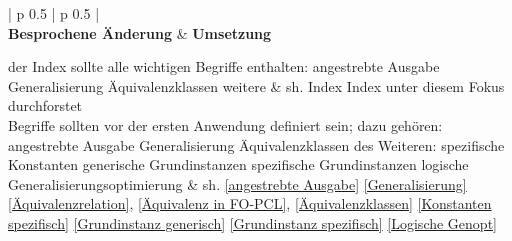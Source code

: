 \documentclass[a4paper, 11pt]{book}
\newlength{\currentLongTableWidth} %
\begin{document}
\setlength{\currentLongTableWidth}{\textwidth} %
\addtolength{\currentLongTableWidth}{-4\tabcolsep} %
\begin{footnotesize}
	\begin{longtable}{ | p {0.5\currentLongTableWidth} | p {0.5\currentLongTableWidth}  |}
		\hline
		\\\hline\hline
		\hline
		\textbf{Besprochene Änderung} 
		& \textbf{Umsetzung} 
	
		
		\endhead
		\hline
		\endfoot
		\endlastfoot
		\hline
		der Index sollte alle wichtigen Begriffe enthalten: \newline angestrebte Ausgabe \newline Generalisierung \newline Äquivalenzklassen \newline weitere
		& sh.  Index \newline \newline \newline \newline Index unter diesem Fokus durchforstet\\
		\hline
		Begriffe sollten vor der ersten Anwendung definiert sein; dazu gehören: \newline angestrebte Ausgabe \newline Generalisierung \newline Äquivalenzklassen \newline des Weiteren: \newline spezifische Konstanten \newline generische Grundinstanzen \newline spezifische Grundinstanzen \newline logische Generalisierungsoptimierung
		&  sh. \newline \newline \ref{angestrebte Ausgabe} \newline \ref{Generalisierung} \newline \ref{Äquivalenzrelation}, \ref{Äquivalenz in FO-PCL}, \ref{Äquivalenzklassen} \newline \newline \ref{Konstanten spezifisch} \newline \ref{Grundinstanz generisch} \newline \ref{Grundinstanz spezifisch} \newline \ref{Logische Genopt} \\

\end{longtable}
\end{footnotesize}
\end{document}
